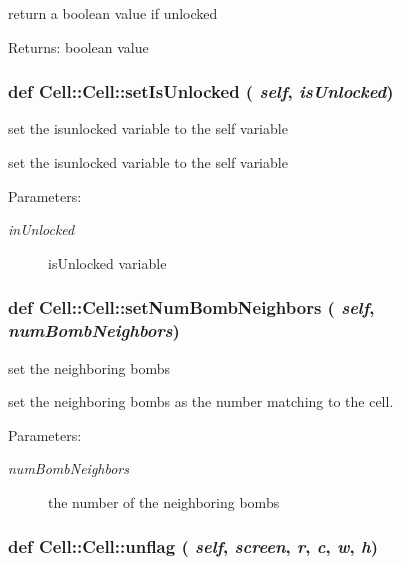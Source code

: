 return a boolean value if unlocked \begin{Desc}
\item[Returns:]boolean value \end{Desc}
\subsubsection{\setlength{\rightskip}{0pt plus 5cm}def Cell::Cell::set\-Is\-Unlocked ( {\em self},  {\em is\-Unlocked})}\label{classCell_1_1Cell_022bd43ce5b72608fa92ef79ce1d4c28}


set the isunlocked variable to the self variable 

set the isunlocked variable to the self variable \begin{Desc}
\item[Parameters:]
\begin{description}
\item[{\em in\-Unlocked}]is\-Unlocked variable \end{description}
\end{Desc}
\subsubsection{\setlength{\rightskip}{0pt plus 5cm}def Cell::Cell::set\-Num\-Bomb\-Neighbors ( {\em self},  {\em num\-Bomb\-Neighbors})}\label{classCell_1_1Cell_fbcf4f43fd7814340c9ce4707f94f860}


set the neighboring bombs 

set the neighboring bombs as the number matching to the cell. \begin{Desc}
\item[Parameters:]
\begin{description}
\item[{\em num\-Bomb\-Neighbors}]the number of the neighboring bombs \end{description}
\end{Desc}
\subsubsection{\setlength{\rightskip}{0pt plus 5cm}def Cell::Cell::unflag ( {\em self},  {\em screen},  {\em r},  {\em c},  {\em w},  {\em h})}\label{classCell_1_1Cell_6d2a01eb700e9568c363e9bfa3372fb5}



